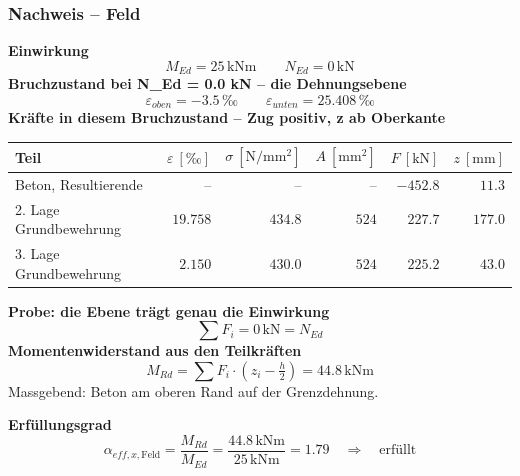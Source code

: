\documentclass[11pt,a4paper]{article}
\begin{document}
\subsubsection{Nachweis – Feld}
\noindent\textbf{Einwirkung}
\begin{equation*}
M_{Ed} = 25\,\mathrm{kNm} \qquad N_{Ed} = 0\,\mathrm{kN}
\end{equation*}
\noindent\textbf{Bruchzustand bei N\_Ed = 0.0 kN – die Dehnungsebene}
\begin{equation*}
\varepsilon_{oben} = -3.5\,\text{‰} \qquad \varepsilon_{unten} = 25.408\,\text{‰}
\end{equation*}
\noindent\textbf{Kräfte in diesem Bruchzustand – Zug positiv, z ab Oberkante}
\begin{longtable}{lrrrrr}
\hline
Teil & $\varepsilon\ [‰]$ & $\sigma\ [\mathrm{N/mm^2}]$ & $A\ [\mathrm{mm}^2]$ & $F\ [\mathrm{kN}]$ & $z\ [\mathrm{mm}]$ \\
\hline
\endhead
Beton, Resultierende & $–$ & $–$ & $–$ & $-452.8$ & $11.3$ \\
2. Lage Grundbewehrung & $19.758$ & $434.8$ & $524$ & $227.7$ & $177.0$ \\
3. Lage Grundbewehrung & $2.150$ & $430.0$ & $524$ & $225.2$ & $43.0$ \\
\hline
\end{longtable}
\noindent\textbf{Probe: die Ebene trägt genau die Einwirkung}
\begin{equation*}
\sum F_i = 0\,\mathrm{kN} = N_{Ed}
\end{equation*}
\noindent\textbf{Momentenwiderstand aus den Teilkräften}
\begin{equation*}
M_{Rd} = \sum F_i \cdot \left(z_i - \tfrac{h}{2}\right) = 44.8\,\mathrm{kNm}
\end{equation*}
Massgebend: Beton am oberen Rand auf der Grenzdehnung.

\noindent\textbf{Erfüllungsgrad}
\begin{equation*}
\alpha_{eff,x,\text{Feld}} = \frac{M_{Rd}}{M_{Ed}} = \frac{44.8\,\mathrm{kNm}}{25\,\mathrm{kNm}} = 1.79 \quad \Rightarrow \quad \text{erfüllt}
\end{equation*}
\end{document}

